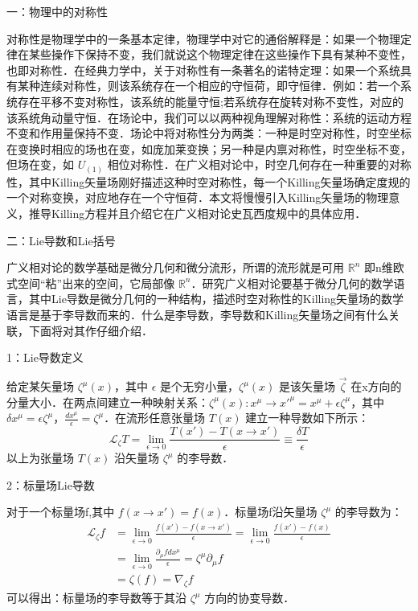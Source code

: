 
一：物理中的对称性

对称性是物理学中的一条基本定律，物理学中对它的通俗解释是：如果一个物理定律在某些操作下保持不变，我们就说这个物理定律在这些操作下具有某种不变性，也即对称性．在经典力学中，关于对称性有一条著名的诺特定理：如果一个系统具有某种连续对称性，则该系统存在一个相应的守恒荷，即守恒律．例如：若一个系统存在平移不变对称性，该系统的能量守恒;若系统存在旋转对称不变性，对应的该系统角动量守恒．在场论中，我们可以以两种视角理解对称性：系统的运动方程不变和作用量保持不变．场论中将对称性分为两类：一种是时空对称性，时空坐标在变换时相应的场也在变，如庞加莱变换；另一种是内禀对称性，时空坐标不变，但场在变，如 $U_{(1)}$ 相位对称性．在广义相对论中，时空几何存在一种重要的对称性，其中Killing矢量场刚好描述这种时空对称性，每一个Killing矢量场确定度规的一个对称变换，对应地存在一个守恒荷．本文将慢慢引入Killing矢量场的物理意义，推导Killing方程并且介绍它在广义相对论史瓦西度规中的具体应用．

 二：Lie导数和Lie括号

广义相对论的数学基础是微分几何和微分流形，所谓的流形就是可用 $\mathbb{R}^{n}$ 即n维欧式空间“粘”出来的空间，它局部像 $\mathbb{R}^{n}$．研究广义相对论要基于微分几何的数学语言，其中Lie导数是微分几何的一种结构，描述时空对称性的Killing矢量场的数学语言是基于李导数而来的．什么是李导数，李导数和Killing矢量场之间有什么关联，下面将对其作仔细介绍．

1：Lie导数定义

给定某矢量场 $\zeta^{\mu}(x)$，其中 $\epsilon$ 是个无穷小量，$\zeta^{\mu}(x)$ 是该矢量场 $\overrightarrow{\zeta}$ 在x方向的分量大小．在两点间建立一种映射关系：$\zeta^{\mu}(x):x^{\mu}\rightarrow x'^{\mu}=x^{\mu}+\epsilon\zeta^{\mu}$，其中 $\delta x^{\mu}=\epsilon\zeta^{\mu}$，$\frac{d x^{\mu}}{\epsilon}=\zeta^{\mu}$．在流形任意张量场 $T(x)$ 建立一种导数如下所示：
$$\begin{equation}
\mathcal{L}_{\zeta}T=\lim_{\epsilon\rightarrow0}\frac{T(x')-T(x\rightarrow x')}{\epsilon}\equiv \frac{\delta T}{\epsilon}
\end{equation}$$
以上为张量场 $T(x)$ 沿矢量场 $\zeta^{\mu}$ 的李导数．

2：标量场Lie导数

对于一个标量场f,其中 $f(x\rightarrow x')=f(x)$．标量场f沿矢量场 $\zeta^{\mu}$ 的李导数为：
$$\begin{aligned}
\mathcal{L}_{\zeta} f &=\lim _{\epsilon \rightarrow 0} \frac{f(x')-f(x \rightarrow x')}{\epsilon}=\lim _{\epsilon \rightarrow 0} \frac{f(x')-f(x)}{\epsilon} \\
&=\lim _{\epsilon\rightarrow 0} \frac{\partial_{\mu} fd x^{\mu}}{\epsilon}=\zeta^{\mu}\partial_{\mu}f \\
&=\zeta(f)=\nabla_{\zeta}f
\end{aligned}$$
可以得出：标量场的李导数等于其沿 $\zeta^{\mu}$ 方向的协变导数．

